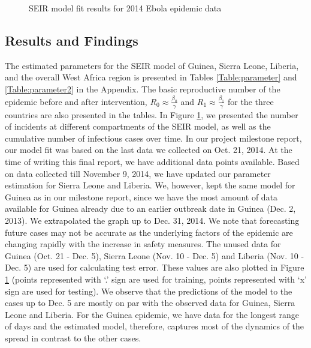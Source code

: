 \documentclass[10pt, journal,onecolumn]{IEEEtran}
\begin{document}
\begin{figure}[ht]
\quad
{}

\caption{SEIR model fit results for 2014 Ebola epidemic data}
\label{Fig:figurePrediction}
\end{figure}


\subsection{Results and Findings} The estimated parameters for the SEIR model of Guinea, Sierra
Leone, Liberia, and the overall West Africa region is presented in Tables \ref{Table:parameter} and
\ref{Table:parameter2} in the Appendix. The basic reproductive number of the epidemic before and after
intervention, $R_0 \approx \frac{\beta_0}{\gamma}$  and $R_1 \approx \frac{\beta_1}{\gamma}$ for the
three countries are also presented in the tables. In Figure \ref{Fig:figurePrediction}, we presented
the number of incidents at different compartments of the SEIR model, as well as the cumulative
number of infectious cases over time. In our project milestone report, our model fit was based on
the last data we collected on Oct. 21, 2014. At the time of writing this final report, we have
additional data points available. Based on data collected till November 9, 2014, we have updated our
parameter estimation for Sierra Leone and Liberia. We, however, kept the same model for Guinea as in
our milestone report, since we have the most amount of data available for Guinea already due to an
earlier outbreak date in Guinea (Dec. 2, 2013). We extrapolated the graph up to Dec. 31, 2014.  We
note that forecasting future cases may not be accurate as the underlying factors of the epidemic are
changing rapidly with the increase in safety measures. The unused data for Guinea (Oct. 21 - Dec.
5), Sierra Leone (Nov. 10 - Dec. 5) and Liberia (Nov. 10 - Dec. 5) are used for calculating test
error. These values are also plotted in Figure \ref{Fig:figurePrediction} (points represented with
`.' sign are used for training, points represented with `x' sign are used for testing). We observe
that the predictions of the model to the cases up to Dec. 5 are mostly on par with the observed data
for Guinea, Sierra Leone and Liberia. For the Guinea epidemic, we have data for the longest range of
days and the estimated model, therefore, captures most of the dynamics of the spread in contrast to
the other cases.
\end{document}
